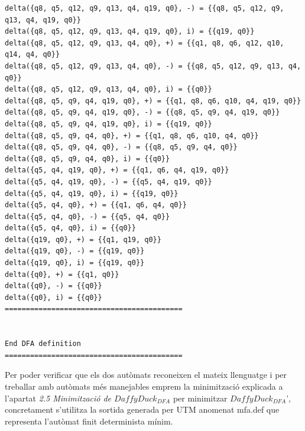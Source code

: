 \documentclass[12pt,a4paper]{report}
\def \dfa{$DaffyDuck_{DFA} $}
\begin{document}
\begin{lstlisting}
delta({q8, q5, q12, q9, q13, q4, q19, q0}, -) = {{q8, q5, q12, q9, q13, q4, q19, q0}}
delta({q8, q5, q12, q9, q13, q4, q19, q0}, i) = {{q19, q0}}
delta({q8, q5, q12, q9, q13, q4, q0}, +) = {{q1, q8, q6, q12, q10, q14, q4, q0}}
delta({q8, q5, q12, q9, q13, q4, q0}, -) = {{q8, q5, q12, q9, q13, q4, q0}}
delta({q8, q5, q12, q9, q13, q4, q0}, i) = {{q0}}
delta({q8, q5, q9, q4, q19, q0}, +) = {{q1, q8, q6, q10, q4, q19, q0}}
delta({q8, q5, q9, q4, q19, q0}, -) = {{q8, q5, q9, q4, q19, q0}}
delta({q8, q5, q9, q4, q19, q0}, i) = {{q19, q0}}
delta({q8, q5, q9, q4, q0}, +) = {{q1, q8, q6, q10, q4, q0}}
delta({q8, q5, q9, q4, q0}, -) = {{q8, q5, q9, q4, q0}}
delta({q8, q5, q9, q4, q0}, i) = {{q0}}
delta({q5, q4, q19, q0}, +) = {{q1, q6, q4, q19, q0}}
delta({q5, q4, q19, q0}, -) = {{q5, q4, q19, q0}}
delta({q5, q4, q19, q0}, i) = {{q19, q0}}
delta({q5, q4, q0}, +) = {{q1, q6, q4, q0}}
delta({q5, q4, q0}, -) = {{q5, q4, q0}}
delta({q5, q4, q0}, i) = {{q0}}
delta({q19, q0}, +) = {{q1, q19, q0}}
delta({q19, q0}, -) = {{q19, q0}}
delta({q19, q0}, i) = {{q19, q0}}
delta({q0}, +) = {{q1, q0}}
delta({q0}, -) = {{q0}}
delta({q0}, i) = {{q0}}
==========================================


End DFA definition
==========================================

\end{lstlisting}

Per poder verificar que els dos autòmats reconeixen el mateix llenguatge i per treballar amb autòmats més manejables emprem la minimització explicada a l’apartat \textit{2.5 Minimització de \dfa{}} per minimitzar \dfa{}', concretament s’utilitza la sortida generada per UTM anomenat mfa.def que representa l’autòmat finit determinista mínim.
\end{document}

